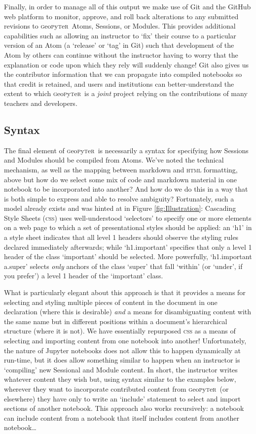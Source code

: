 \documentclass[letter, 11pt,titlepage]{article}
\newcommand{\gp}{\textsc{g}eo\textsc{p}y\textsc{t}e\textsc{r}~\/}
\begin{document}
Finally, in order to manage all of this output we make use of Git and the GitHub
web platform to monitor, approve, and roll back alterations to any submitted
revisions to \gp Atoms, Sessions, or Modules. This provides additional
capabilities such as allowing an instructor to `fix' their course to a
particular version of an Atom (a `release' or `tag' in Git) such that
development of the Atom by others can continue without the instructor having to
worry that the explanation or code upon which they rely will suddenly change!
Git also gives us the contributor information that we can propagate into
compiled notebooks so that credit is retained, and users and institutions can
better-understand the extent to which \gp is a \emph{joint} project relying on
the contributions of many teachers and developers.

\subsection{Syntax}\label{syntax}

The final element of \gp is necessarily a syntax for specifying how Sessions and
Modules should be compiled from Atoms. We've noted the technical mechanism, as
well as the mapping between markdown and \textsc{html} formatting, above but how
do we select some mix of code and markdown material in one notebook to be
incorporated into another? And how do we do this in a way that is both simple to
express and able to resolve ambiguity? Fortunately, such a model already exists
and was hinted at in Figure \ref{fig:Illustration}: Cascading Style Sheets
(\textsc{css}) uses well-understood `selectors' to specify one or more elements
on a web page to which a set of presentational styles should be applied: an `h1'
in a style sheet indicates that all level 1 headers should observe the styling
rules declared immediately afterwards; while `h1.important' specifies that only
a level 1 header of the class `important' should be selected. More powerfully,
`h1.important a.super' selects \emph{only} anchors of the class `super' that
fall `within' (or `under', if you prefer') a level 1 header of the `important'
class.

What is particularly elegant about this approach is that it provides a means for
selecting and styling multiple pieces of content in the document in one
declaration (where this is desirable) \textit{and} a means for disambiguating
content with the same name but in different positions within a document's
hierarchical structure (where it is not). We have essentially repurposed
\textsc{css} as a means of selecting and importing content from one notebook
into another! Unfortunately, the nature of Jupyter notebooks does not allow this
to happen dynamically at run-time, but it does allow something similar to happen
when an instructor is `compiling' new Sessional and Module content. In short,
the instructor writes whatever content they wish but, using syntax similar to
the examples below, wherever they want to incorporate contributed content from
\gp (or elsewhere) they have only to write an `include' statement to select and
import sections of another notebook. This approach also works recursively: a
notebook can include content from a notebook that itself includes content from
another notebook\ldots
\end{document}
